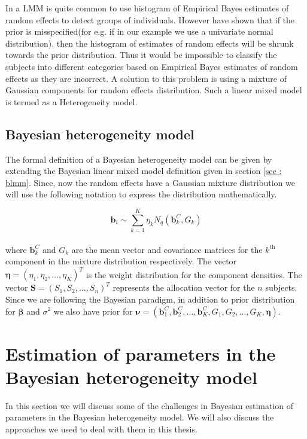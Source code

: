 In a LMM is quite common to use histogram of Empirical Bayes estimates of random effects to detect groups of individuals. However \citet{verbeke_linear_1996} have shown that if the prior is misspecified(for e.g. if in our example we use a univariate normal distribution), then the histogram of estimates of random effects will be shrunk towards the prior distribution. Thus it would be impossible to classify the subjects into different categories based on Empirical Bayes estimates of random effects as they are incorrect. A solution to this problem is using a mixture of Gaussian components for random effects distribution. Such a linear mixed model is termed as a Heterogeneity model.

\subsection{Bayesian heterogeneity model}
\label{subsec : bhtge}
The formal definition of a Bayesian heterogeneity model can be given by extending the Bayesian linear mixed model definition given in section \ref{sec : blmm}. Since, now the random effects have a Gaussian mixture distribution we will use the following notation to express the distribution mathematically.

$$\boldsymbol{b}_i \sim \sum_{k=1}^{K} \eta_k N_q(\boldsymbol{b}_k^C, G_k)$$\\
where $\boldsymbol{b}_k^C$ and $G_k$ are the mean vector and covariance matrices for the $k^\text{th}$ component in the mixture distribution respectively. The vector $\boldsymbol{\eta} = (\eta_1, \eta_2, \ldots, \eta_K)^T$ is the weight distribution for the component densities. The vector $\boldsymbol{S}=(S_1, S_2, ..., S_n)^T$ represents the allocation vector for the $n$ subjects. Since we are following the Bayesian paradigm, in addition to prior distribution for $\boldsymbol{\beta}$ and $\sigma^2$ we also have prior for $\boldsymbol{\nu} = (\boldsymbol{b}_1^C, \boldsymbol{b}_2^C, \ldots, \boldsymbol{b}_K^C, G_1, G_2, \ldots, G_K, \boldsymbol{\eta})$.


\section{Estimation of parameters in the Bayesian heterogeneity model}
In this section we will discuss some of the challenges in Bayesian estimation of parameters in the Bayesian heterogeneity model. We will also discuss the approaches we used to deal with them in this thesis.


